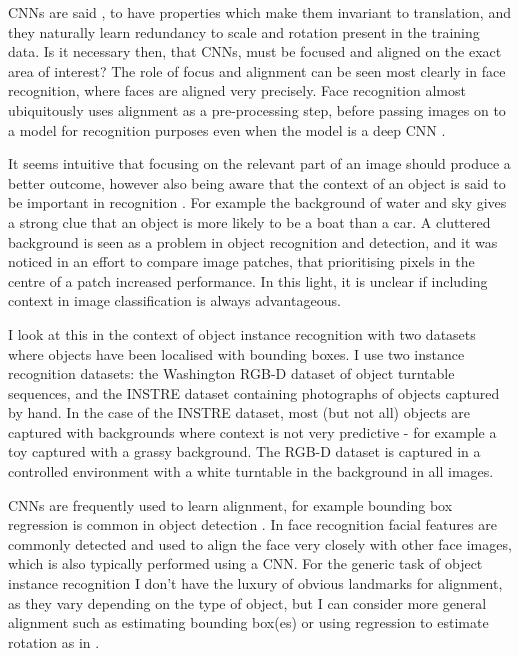 \gls{CNN}s are said \cite{Krizhevsky2012}, to have properties which make them invariant to translation, and they naturally learn redundancy to scale and rotation present in the training data. Is it necessary then, that \gls{CNN}s, must be focused and aligned on the exact area of interest? The role of focus and alignment can be seen most clearly in face recognition, where faces are aligned very precisely. Face recognition almost ubiquitously uses alignment as a pre-processing step, before passing images on to a model for recognition purposes even when the model is a deep CNN \cite{Taigman2014}.

It seems intuitive that focusing on the relevant part of an image should produce a better outcome, however also being aware that the context of an object is said to be important in recognition \cite{Oliva2007}. For example the background of water and sky gives a strong clue that an object is more likely to be a boat than a car. A cluttered background is seen as a problem in object recognition and detection, and it was noticed in an effort to compare image patches, that prioritising pixels in the centre of a patch \cite{Zagoruyko2015} increased performance. In this light, it is unclear if including context in image classification is always advantageous. 

I look at this in the context of object instance recognition with two datasets where objects have been localised with bounding boxes. I use two instance recognition datasets: the Washington RGB-D dataset \cite{Lai2011} of object turntable sequences, and the INSTRE dataset \cite{Wang2015} containing photographs of objects captured by hand. In the case of the INSTRE dataset, most (but not all) objects are captured with backgrounds where context is not very predictive - for example a toy captured with a grassy background. The RGB-D dataset is captured in a controlled environment with a white turntable in the background in all images.

\gls{CNN}s are frequently used to learn alignment, for example bounding box regression is common in object detection \cite{Sermanet2013}. In face recognition facial features are commonly detected and used to align the face very closely with other face images, which is also typically performed using a CNN. For the generic task of object instance recognition I don't have the luxury of obvious landmarks for alignment, as they vary depending on the type of object, but I can consider more general alignment such as estimating bounding box(es) or using regression to estimate rotation as in \cite {Fischer2015}. 

